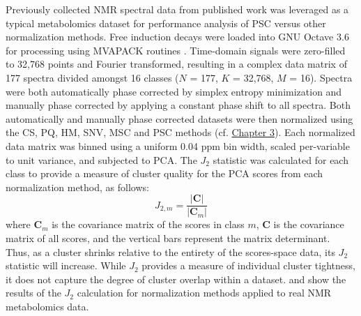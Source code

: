 \begin{doublespace}
Previously collected \hnmr{} NMR spectral data from published work
\cite{halouska:acscb2012} was leveraged as a typical metabolomics dataset
for performance analysis of PSC versus other normalization methods. Free
induction decays were loaded into GNU Octave 3.6 \cite{eaton2008} for
processing using MVAPACK routines \cite{worley:acscb2014}. Time-domain signals
were zero-filled to 32,768 points and Fourier transformed, resulting in
a complex data matrix of 177 spectra divided amongst 16 classes
($N$ = 177, $K$ = 32,768, $M$ = 16). Spectra were both automatically phase
corrected by simplex entropy minimization \cite{chen:jmr2002} and manually
phase corrected by applying a constant phase shift to all spectra. Both
automatically and manually phase corrected datasets were then normalized using
the CS, PQ, HM, SNV, MSC and PSC methods
(cf. \hyperlink{subsection.3.4.3}{Chapter 3}).
Each normalized data matrix was binned using a uniform 0.04 ppm bin width,
scaled per-variable to unit variance, and subjected to PCA. The $J_2$ statistic
\cite{koutroumbas2006} was calculated for each class to provide a measure of
cluster quality for the PCA scores from each normalization method, as follows:
\begin{equation}
J_{2,m} = \frac{|\mathbf{C}|}{|\mathbf{C}_m|}
\end{equation}
where $\mathbf{C}_m$ is the covariance matrix of the scores in class $m$,
$\mathbf{C}$ is the covariance matrix of all scores, and the vertical bars
represent the matrix determinant. Thus, as a cluster shrinks relative to the
entirety of the scores-space data, its $J_2$ statistic will increase. While
$J_2$ provides a measure of individual cluster tightness, it does not capture
the degree of cluster overlap within a dataset.  and
 show the results of the $J_2$ calculation for normalization
methods applied to real \hnmr{} NMR metabolomics data.
\end{doublespace}

